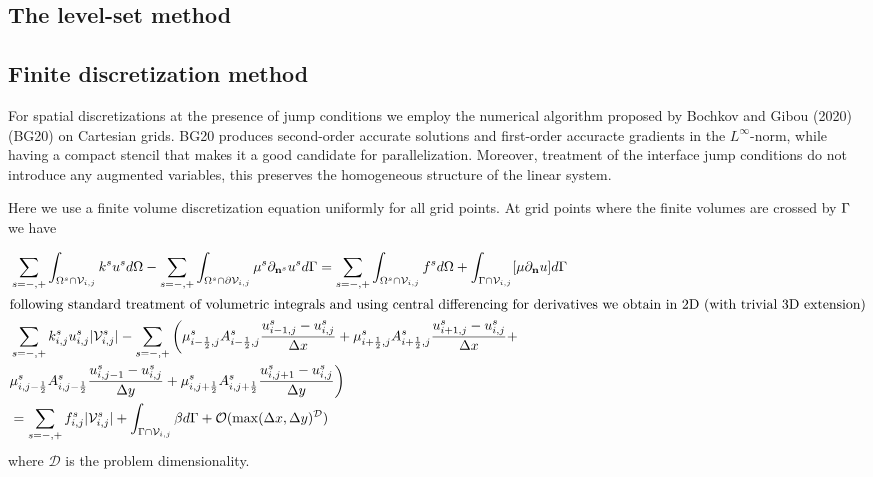 \documentclass{elsarticle}
\begin{document}
\subsection{The level-set method}

\subsection{Finite discretization method}

For spatial discretizations at the presence of jump conditions we employ the numerical algorithm proposed by Bochkov and Gibou (2020) \cite{bochkov2020solving} (BG20) on Cartesian grids. BG20 produces second-order accurate solutions and first-order accuracte gradients in the $L^\infty$-norm, while having a compact stencil that makes it a good candidate for parallelization. Moreover, treatment of the interface jump conditions do not introduce any augmented variables, this preserves the homogeneous structure of the linear system. 

Here we use a finite volume discretization equation uniformly for all grid points. At grid points where the finite volumes are crossed by $\rm \Gamma$ we have

\begin{align*}
&\sum_{s=-,+}\int_{\Omega^s \cap \mathcal{V}_{i,j}}  k^{s} u^{s} d\Omega -\sum_{s=-,+} \int_{\Omega^s\cap \partial\mathcal{V}_{i,j}} \mu^{s}\partial_{\mathbf{n}^s} u^s  d\Gamma = \sum_{s=-,+}\int_{\Omega^s \cap \mathcal{V}_{i,j}}  f^{s} d\Omega + \int_{\Gamma \cap \mathcal{V}_{i,j}}[\mu\partial_{\mathbf{n}}u]d\Gamma \\
\intertext{following standard treatment of volumetric integrals and using central differencing for derivatives we obtain in 2D (with trivial 3D extension)}
& \sum_{s=-,+} k_{i,j}^s u_{i,j}^{s} |\mathcal{V}_{i,j}^s| - \sum_{s=-,+}\bigg( \mu_{i-\frac{1}{2},j}^s A_{i-\frac{1}{2},j}^s\frac{u_{i-1,j}^s - u_{i,j}^s}{\Delta x}     +   \mu_{i+\frac{1}{2},j}^s A_{i+\frac{1}{2},j}^s\frac{u_{i+1,j}^s - u_{i,j}^s}{\Delta x} + \\
& \mu_{i, j-\frac{1}{2}}^s A_{i, j-\frac{1}{2}}^s\frac{u_{i,j-1}^s - u_{i,j}^s}{\Delta y} + \mu_{i, j+\frac{1}{2}}^s A_{i, j+\frac{1}{2}}^s\frac{u_{i,j+1}^s - u_{i,j}^s}{\Delta y} \bigg)  \\
&=  \sum_{s=-,+} f_{i,j}^{s} |\mathcal{V}_{i,j}^s| + \int_{\Gamma\cap \mathcal{V}_{i,j}} \beta d\Gamma + \mathcal{O}(\max(\Delta x, \Delta y)^\mathcal{D})
\end{align*}
where $\mathcal{D}$ is the problem dimensionality.
\end{document}
